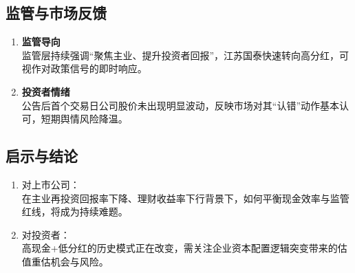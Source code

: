 \subsection{监管与市场反馈}
\begin{enumerate}[leftmargin=*, nosep]
    \item \textbf{监管导向}  \\
    监管层持续强调“聚焦主业、提升投资者回报”，江苏国泰快速转向高分红，可视作对政策信号的即时响应。
    \item \textbf{投资者情绪}  \\
    公告后首个交易日公司股价未出现明显波动，反映市场对其“认错”动作基本认可，短期舆情风险降温。
\end{enumerate}

\subsection{启示与结论}
\begin{enumerate}[leftmargin=*, nosep]
    \item 对上市公司：  \\
    在主业再投资回报率下降、理财收益率下行背景下，如何平衡现金效率与监管红线，将成为持续难题。
    \item 对投资者：  \\
    高现金+低分红的历史模式正在改变，需关注企业资本配置逻辑突变带来的估值重估机会与风险。
\end{enumerate}
